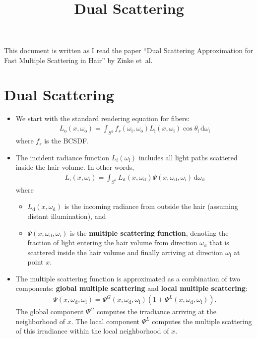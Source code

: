 \documentclass[10pt]{article}
\title{Dual Scattering}
\author{}
\newcommand{\dee}{\mathrm{d}}
\newcommand{\In}{\mathrm{i}}
\newcommand{\Out}{\mathrm{o}}
\newcommand{\etal}{{et~al.}}
\begin{document}
  \maketitle

  This document is written as I read the paper ``Dual Scattering Approximation for Fast Multiple Scattering in Hair'' by Zinke \etal\ \cite{Zinke:2008}

  \section{Dual Scattering} %
  \label{sec:dual_scattering}

  \begin{itemize}
    \item We start with the standard rendering equation for fibers:
    \begin{align*}
      L_\Out(x,\omega_\Out) = \int_{S^2} f_s(\omega_\In, \omega_\Out) L_\In(x,\omega_\In) \cos \theta_\In\, \dee \omega_\In
    \end{align*}
    where $f_s$ is the BCSDF.

    \item The incident radiance function $L_i(\omega_\In)$ includes all light paths scattered inside the hair volume. In other words,
    \begin{align*}
      L_\In(x,\omega_\In) = \int_{S^2} L_\dee(x,\omega_\dee) \Psi(x,\omega_\dee, \omega_\In)\, \dee \omega_\dee
    \end{align*}
    where
    \begin{itemize}
      \item $L_\dee(x,\omega_\dee)$ is the incoming radiance from outside the hair (assuming distant illumination), and
      \item $\Psi(x,\omega_\dee, \omega_\In)$ is the \textbf{multiple scattering function}, denoting the fraction of light entering the hair volume from direction $\omega_\dee$ that is scattered inside the hair volume and finally arriving at direction $\omega_\In$ at point $x$.
    \end{itemize}

    \item The multiple scattering function is approximated as a combination of two components: {\bf global multiple scattering} and {\bf local multiple scattering}:
    \begin{align*}
      \Psi(x,\omega_\dee, \omega_\In) = \Psi^G(x, \omega_\dee, \omega_\In) ( 1 + \Psi^L(x, \omega_\dee, \omega_\In)).
    \end{align*}
    The global component $\Psi^G$ computes the irradiance arriving at the neighborhood of $x$. The local component $\Psi^L$ computes the multiple scattering of this irradiance within the local neighborhood of $x$.      
  \end{itemize}
\end{document}
